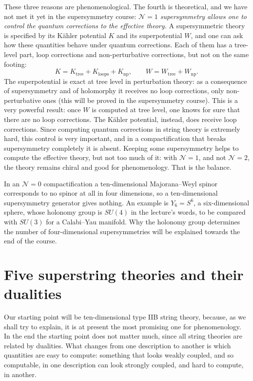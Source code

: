 These three reasons are phenomenological. The fourth is theoretical, and we have not met it yet in the supersymmetry course: \emph{$\mathcal N=1$ supersymmetry allows one to control the quantum corrections to the effective theory.} A supersymmetric theory is specified by its Kähler potential $K$ and its superpotential $W$, and one can ask how these quantities behave under quantum corrections. Each of them has a tree-level part, loop corrections and non-perturbative corrections, but not on the same footing:
\begin{equation}
  K = K_{\text{tree}} + K_{\text{loops}} + K_{\text{np}} ,\qquad
  W = W_{\text{tree}} + W_{\text{np}} .
  \label{eq:L2-KW}
\end{equation}
The superpotential is exact at tree level in perturbation theory: as a consequence of supersymmetry and of holomorphy it receives no loop corrections, only non-perturbative ones (this will be proved in the supersymmetry course). This is a very powerful result: once $W$ is computed at tree level, one knows for sure that there are no loop corrections. The Kähler potential, instead, does receive loop corrections. Since computing quantum corrections in string theory is extremely hard, this control is very important, and in a compactification that breaks supersymmetry completely it is absent. Keeping some supersymmetry helps to compute the effective theory, but not too much of it: with $\mathcal N=1$, and not $\mathcal N=2$, the theory remains chiral and good for phenomenology. That is the balance.

In an $\mathcal N=0$ compactification a ten-dimensional Majorana--Weyl spinor corresponds to no spinor at all in four dimensions, so a ten-dimensional supersymmetry generator gives nothing. An example is $Y_6 = S^6$, a six-dimensional sphere, whose holonomy group is $SU(4)$ in the lecture's words, to be compared with $SU(3)$ for a Calabi--Yau manifold.
Why the holonomy group determines the number of four-dimensional supersymmetries will be explained towards the end of the course.

\section{Five superstring theories and their dualities}
\label{sec:L2-dualities}

Our starting point will be ten-dimensional type IIB string theory, because, as we shall try to explain, it is at present the most promising one for phenomenology. In the end the starting point does not matter much, since all string theories are related by dualities. What changes from one description to another is which quantities are easy to compute: something that looks weakly coupled, and so computable, in one description can look strongly coupled, and hard to compute, in another.

